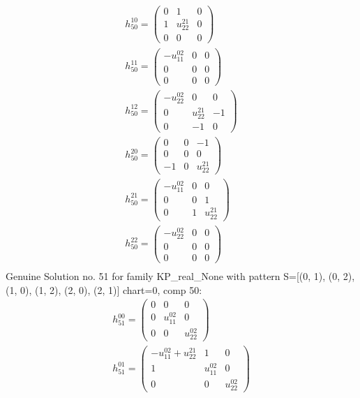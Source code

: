 \documentclass[a4paper, 11pt, twoside, onecolumn]{article}
\begin{document}
\begin{landscape}
\begin{gather*}
	 h_{50}^{10}=\begin{pmatrix}0 & 1 & 0\\1 & u^{21}_{22} & 0\\0 & 0 & 0\end{pmatrix}\\ 
	 h_{50}^{11}=\begin{pmatrix}- u^{02}_{11} & 0 & 0\\0 & 0 & 0\\0 & 0 & 0\end{pmatrix}\\ 
	 h_{50}^{12}=\begin{pmatrix}- u^{02}_{22} & 0 & 0\\0 & u^{21}_{22} & -1\\0 & -1 & 0\end{pmatrix}\\ 
	 h_{50}^{20}=\begin{pmatrix}0 & 0 & -1\\0 & 0 & 0\\-1 & 0 & u^{21}_{22}\end{pmatrix}\\ 
	 h_{50}^{21}=\begin{pmatrix}- u^{02}_{11} & 0 & 0\\0 & 0 & 1\\0 & 1 & u^{21}_{22}\end{pmatrix}\\ 
	 h_{50}^{22}=\begin{pmatrix}- u^{02}_{22} & 0 & 0\\0 & 0 & 0\\0 & 0 & 0\end{pmatrix}\\ 
\end{gather*} 
Genuine Solution no. 51 for family KP_real_None with pattern S=[(0, 1), (0, 2), (1, 0), (1, 2), (2, 0), (2, 1)] chart=0, comp 50: 
\begin{gather*} 
	 h_{51}^{00}=\begin{pmatrix}0 & 0 & 0\\0 & u^{02}_{11} & 0\\0 & 0 & u^{02}_{22}\end{pmatrix}\\ 
	 h_{51}^{01}=\begin{pmatrix}- u^{02}_{11} + u^{21}_{22} & 1 & 0\\1 & u^{02}_{11} & 0\\0 & 0 & u^{02}_{22}\end{pmatrix}\\ 

\end{gather*}
\end{landscape}
\end{document}
